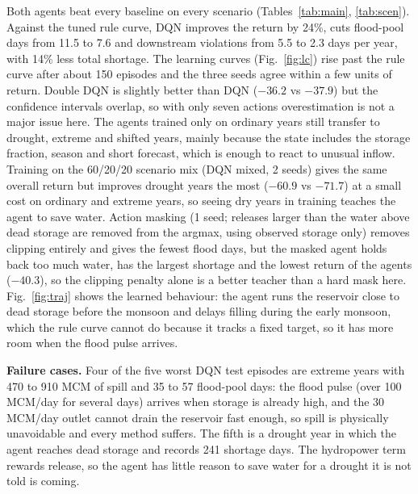 \documentclass[10pt,twocolumn]{article}
\begin{document}
Both agents beat every baseline on every scenario (Tables~\ref{tab:main}, \ref{tab:scen}). Against the tuned rule curve, DQN improves the return by 24\%, cuts flood-pool days from 11.5 to 7.6 and downstream violations from 5.5 to 2.3 days per year, with 14\% less total shortage. The learning curves (Fig.~\ref{fig:lc}) rise past the rule curve after about 150 episodes and the three seeds agree within a few units of return. Double DQN is slightly better than DQN ($-36.2$ vs $-37.9$) but the confidence intervals overlap, so with only seven actions overestimation is not a major issue here. The agents trained only on ordinary years still transfer to drought, extreme and shifted years, mainly because the state includes the storage fraction, season and short forecast, which is enough to react to unusual inflow. Training on the 60/20/20 scenario mix (DQN mixed, 2 seeds) gives the same overall return but improves drought years the most ($-60.9$ vs $-71.7$) at a small cost on ordinary and extreme years, so seeing dry years in training teaches the agent to save water. Action masking (1 seed; releases larger than the water above dead storage are removed from the argmax, using observed storage only) removes clipping entirely and gives the fewest flood days, but the masked agent holds back too much water, has the largest shortage and the lowest return of the agents ($-40.3$), so the clipping penalty alone is a better teacher than a hard mask here. Fig.~\ref{fig:traj} shows the learned behaviour: the agent runs the reservoir close to dead storage before the monsoon and delays filling during the early monsoon, which the rule curve cannot do because it tracks a fixed target, so it has more room when the flood pulse arrives.

\textbf{Failure cases.} Four of the five worst DQN test episodes are extreme years with 470 to 910 MCM of spill and 35 to 57 flood-pool days: the flood pulse (over 100 MCM/day for several days) arrives when storage is already high, and the 30 MCM/day outlet cannot drain the reservoir fast enough, so spill is physically unavoidable and every method suffers. The fifth is a drought year in which the agent reaches dead storage and records 241 shortage days. The hydropower term rewards release, so the agent has little reason to save water for a drought it is not told is coming.
\end{document}
